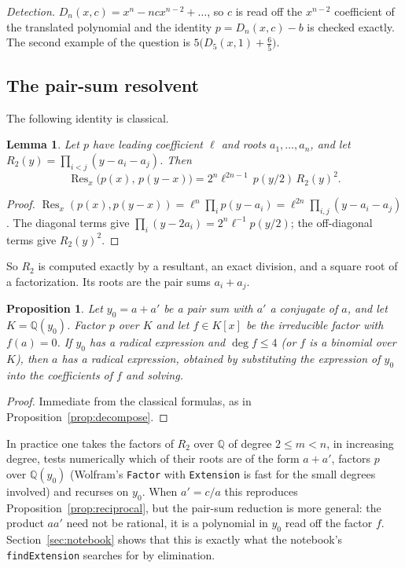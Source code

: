 \documentclass[11pt,a4paper]{article}
\newtheorem{proposition}[theorem]{Proposition}
\newtheorem{lemma}[theorem]{Lemma}
\theoremstyle{definition}
\theoremstyle{remark}
\newcommand{\Q}{\mathbb{Q}}
\newcommand{\Res}{\operatorname{Res}}
\newcommand{\code}[1]{\texttt{#1}}
\begin{document}
\emph{Detection.}  $D_n(x,c)=x^n-ncx^{n-2}+\dots$, so $c$ is read off the $x^{n-2}$
coefficient of the translated polynomial and the identity $p=D_n(x,c)-b$ is checked
exactly.  The second example of the question is $5\bigl(D_5(x,1)+\tfrac65\bigr)$.

\subsection{The pair-sum resolvent}\label{sec:pairsum}

The following identity is classical.

\begin{lemma}\label{lem:pairsum}
Let $p$ have leading coefficient $\ell$ and roots $a_1,\dots,a_n$, and let
$R_2(y)=\prod_{i<j}(y-a_i-a_j)$.  Then
\[
\Res_x\bigl(p(x),\,p(y-x)\bigr)=2^n\ell^{2n-1}\,p(y/2)\,R_2(y)^2 .
\]
\end{lemma}

\begin{proof}
$\Res_x(p(x),p(y-x))=\ell^n\prod_i p(y-a_i)=\ell^{2n}\prod_{i,j}(y-a_i-a_j)$.  The
diagonal terms give $\prod_i(y-2a_i)=2^n\ell^{-1}p(y/2)$; the off-diagonal terms give
$R_2(y)^2$.
\end{proof}

So $R_2$ is computed exactly by a resultant, an exact division, and a square root of a
factorization.  Its roots are the pair sums $a_i+a_j$.

\begin{proposition}\label{prop:pairsum}
Let $y_0=a+a'$ be a pair sum with $a'$ a conjugate of $a$, and let $K=\Q(y_0)$.  Factor
$p$ over $K$ and let $f\in K[x]$ be the irreducible factor with $f(a)=0$.  If $y_0$ has a
radical expression and $\deg f\le4$ (or $f$ is a binomial over $K$), then $a$ has a
radical expression, obtained by substituting the expression of $y_0$ into the
coefficients of $f$ and solving.
\end{proposition}

\begin{proof}
Immediate from the classical formulas, as in Proposition~\ref{prop:decompose}.
\end{proof}

In practice one takes the factors of $R_2$ over $\Q$ of degree $2\le m<n$, in increasing
degree, tests numerically which of their roots are of the form $a+a'$, factors $p$ over
$\Q(y_0)$ (Wolfram's \code{Factor} with \code{Extension} is fast for the small degrees
involved) and recurses on $y_0$.  When $a'=c/a$ this reproduces
Proposition~\ref{prop:reciprocal}, but the pair-sum reduction is more general: the
product $aa'$ need not be rational, it is a polynomial in $y_0$ read off the factor
$f$.  Section~\ref{sec:notebook} shows that this is exactly what the notebook's
\code{findExtension} searches for by elimination.
\end{document}
